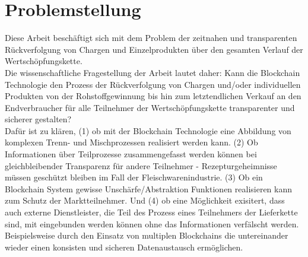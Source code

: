 \section{Problemstellung}

Diese Arbeit beschäftigt sich mit dem Problem der zeitnahen und transparenten Rückverfolgung von Chargen und Einzelprodukten über den gesamten Verlauf der Wertschöpfungskette.\\

Die wissenschaftliche Fragestellung der Arbeit lautet daher: Kann die Blockchain Technologie den Prozess der Rückverfolgung von Chargen und/oder individuellen Produkten von der Rohstoffgewinnung bis hin zum letztendlichen Verkauf an den Endverbraucher für alle Teilnehmer der Wertschöpfungskette transparenter und sicherer gestalten?\\

Dafür ist zu klären, (1) ob mit der Blockchain Technologie eine Abbildung von komplexen Trenn- und Mischprozessen realisiert werden kann. (2) Ob Informationen über Teilprozesse zusammengefasst werden können bei gleichbleibender Transparenz für andere Teilnehmer - Rezepturgeheimnisse müssen geschützt bleiben im Fall der Fleischwarenindustrie. (3) Ob ein Blockchain System gewisse Unschärfe/Abstraktion Funktionen realisieren kann zum Schutz der Marktteilnehmer. Und (4) ob eine Möglichkeit exisitert, dass auch externe Dienstleister, die Teil des Prozess eines Teilnehmers der Lieferkette sind, mit eingebunden werden können ohne das Informationen verfälscht werden. Beispielsweise durch den Einsatz von multiplen Blockchains die untereinander wieder einen konsisten und sicheren Datenaustausch ermöglichen.\\






\newpage
